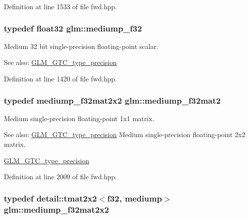 Definition at line 1533 of file fwd.hpp.\hypertarget{group__gtc__type__precision_g3dbba6bd06a546d7a11d1c09c2f04b1a}{
\subsubsection[mediump\_\-f32]{\setlength{\rightskip}{0pt plus 5cm}typedef float32 {\bf glm::mediump\_\-f32}}}
\label{group__gtc__type__precision_g3dbba6bd06a546d7a11d1c09c2f04b1a}


Medium 32 bit single-precision floating-point scalar. \begin{Desc}
\item[See also:]\hyperlink{group__gtc__type__precision}{GLM\_\-GTC\_\-type\_\-precision} \end{Desc}


Definition at line 1420 of file fwd.hpp.\hypertarget{group__gtc__type__precision_g103735a38477f7c389b36aae0fbdf274}{
\subsubsection[mediump\_\-f32mat2]{\setlength{\rightskip}{0pt plus 5cm}typedef mediump\_\-f32mat2x2 {\bf glm::mediump\_\-f32mat2}}}
\label{group__gtc__type__precision_g103735a38477f7c389b36aae0fbdf274}


Medium single-precision floating-point 1x1 matrix. \begin{Desc}
\item[See also:]\hyperlink{group__gtc__type__precision}{GLM\_\-GTC\_\-type\_\-precision} Medium single-precision floating-point 2x2 matrix. 

\hyperlink{group__gtc__type__precision}{GLM\_\-GTC\_\-type\_\-precision} \end{Desc}


Definition at line 2009 of file fwd.hpp.\hypertarget{group__gtc__type__precision_g23c9239d6aa9b41c3d2145e2faa81edb}{
\subsubsection[mediump\_\-f32mat2x2]{\setlength{\rightskip}{0pt plus 5cm}typedef detail::tmat2x2$<$f32, mediump$>$ {\bf glm::mediump\_\-f32mat2x2}}}
\label{group__gtc__type__precision_g23c9239d6aa9b41c3d2145e2faa81edb}


